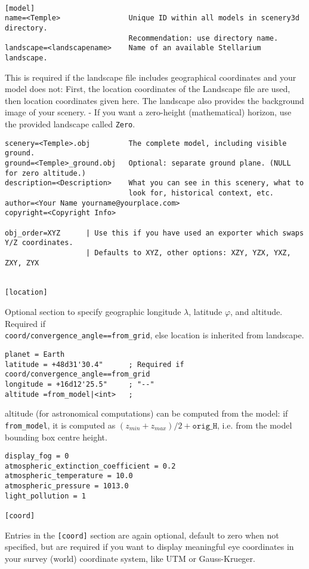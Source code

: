 \documentclass[a4paper]{article}
\newcommand{\filename}[1]{\texttt{#1}}
\begin{document}
\begin{verbatim}

[model]
name=<Temple>                Unique ID within all models in scenery3d directory.
                             Recommendation: use directory name.
landscape=<landscapename>    Name of an available Stellarium landscape.
\end{verbatim}
This is required if the landscape file includes geographical
coordinates and your model does not: First, the location coordinates
of the Landscape file are used, then location coordinates given here.
The landscape also provides the background image of your scenery. - If
you want a zero-height (mathematical) horizon, use the provided
landscape called \filename{Zero}.
\begin{verbatim}
scenery=<Temple>.obj         The complete model, including visible ground.
ground=<Temple>_ground.obj   Optional: separate ground plane. (NULL for zero altitude.)
description=<Description>    What you can see in this scenery, what to 
                             look for, historical context, etc.
author=<Your Name yourname@yourplace.com>
copyright=<Copyright Info>

obj_order=XYZ      | Use this if you have used an exporter which swaps Y/Z coordinates.
                   | Defaults to XYZ, other options: XZY, YZX, YXZ, ZXY, ZYX


[location]
\end{verbatim}
Optional section to specify geographic longitude $\lambda$, latitude
$\varphi$, and altitude. Required if\\
\verb|coord/convergence_angle==from_grid|, else location is inherited
from landscape.
\begin{verbatim}
planet = Earth
latitude = +48d31'30.4"      ; Required if coord/convergence_angle==from_grid
longitude = +16d12'25.5"     ; "--"
altitude =from_model|<int>   ; 
\end{verbatim}
altitude (for astronomical computations) can be computed from the
model:  if \verb|from_model|, it is computed as $(z_{min}+z_{max})/2+\mathtt{orig\_H}$,
i.e. from the model bounding box centre height.

\begin{verbatim}
display_fog = 0
atmospheric_extinction_coefficient = 0.2
atmospheric_temperature = 10.0
atmospheric_pressure = 1013.0
light_pollution = 1

[coord]
\end{verbatim}

Entries in the \verb|[coord]| section are again optional, default to zero when not specified, but are
required if you want to display meaningful eye coordinates in your
survey (world) coordinate system, like UTM or Gauss-Krueger.  
\end{document}
